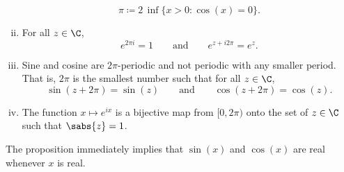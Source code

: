 \begin{prop}
\begin{enumerate}[(i)]
\begin{equation*}
\pi \coloneqq 2 \, \inf \{ x > 0 : \cos(x) = 0 \} .
\end{equation*}
\item
For all $z \in \C$, 
\begin{equation*}
e^{2\pi i} = 1 \qquad \text{and} \qquad e^{z + i 2\pi} = e^z.
\end{equation*}
\item
Sine and cosine are $2\pi$-periodic and not periodic with any smaller
period.  That is, $2\pi$ is the smallest number such that for all $z \in \C$,
\begin{equation*}
\sin(z+2\pi) = \sin(z)
\qquad \text{and} \qquad
\cos(z+2\pi) = \cos(z) .
\end{equation*}
\item
The function $x \mapsto e^{ix}$ is a bijective map from $[0,2\pi)$
onto the set of $z \in \C$ such that $\sabs{z} = 1$.
\end{enumerate}
\end{prop}

The proposition immediately implies that $\sin(x)$ and $\cos(x)$ are 
real whenever $x$ is real.


